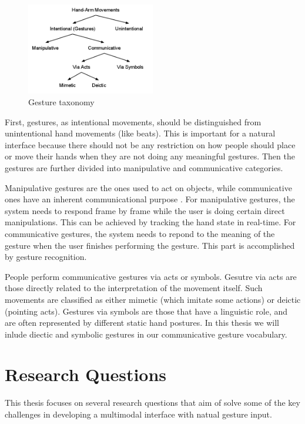 \begin{figure}[h]
  \centering
  \includegraphics[width=0.5\textwidth]{figures/taxonomy.png} 
  \caption{Gesture taxonomy}
  \label{fig:taxonomy}
\end{figure}

First, gestures, as intentional movements, should be distinguished from
unintentional hand movements (like beats). This is important for a natural
interface because there should not be any restriction on how people should
place or move their hands when they are not doing any meaningful gestures. Then
the gestures are further divided into manipulative and communicative categories.

Manipulative gestures are the ones used to act on objects, while communicative 
ones have an inherent communicational purpose \cite{Pavlovic97}. For
manipulative gestures, the system needs to respond frame by frame while the user is doing
certain direct manipulations. This can be achieved by tracking the hand
state in real-time. For communicative gestures, the system needs to repond to
the meaning of the gesture when the user finishes performing the gesture. This part is
accomplished by gesture recognition. 

People perform communicative gestures via acts or symbols. Gesutre via acts are
those directly related to the interpretation of the movement itself. Such
movements are classified as either mimetic (which imitate some actions) or deictic (pointing acts). 
Gestures via symbols are those that have a linguistic role, and are
often represented by different static hand postures. In this thesis we will
inlude diectic and symbolic gestures in our communicative gesture vocabulary.

\cite{wobbrock09}

\section{Research Questions}
This thesis focuses on several research questions that aim of solve some of the
key challenges in developing a multimodal interface with natual gesture input.

